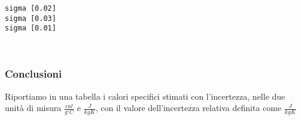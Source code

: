 \documentclass[11pt]{article}
\begin{document}
    \begin{Verbatim}[commandchars=\\\{\}]
sigma [0.02]
sigma [0.03]
sigma [0.01]
    \end{Verbatim}

    \begin{center}
    \end{center}
    { \hspace*{\fill} \\}
    
    \hypertarget{conclusioni}{%
\subsubsection{Conclusioni}\label{conclusioni}}

Riportiamo in una tabella i calori specifici stimati con l'incertezza,
nelle due unità di misura \(\frac{cal}{g^\circ C}\) e \(\frac{J}{kgK}\),
con il valore dell'incertezza relativa definita come \(\frac{J}{kgK}\)
\end{document}
